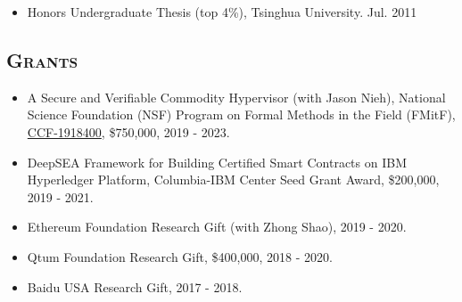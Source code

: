 \documentclass[10pt]{article}
\renewcommand{\section}[1]{
	\vspace{-5pt}
   	\subsection*{\scshape  \bfseries #1}
   }
\newenvironment{innerlist}[1][\enskip\textbullet]%
        {\begin{itemize}[#1,leftmargin=25pt,parsep=0pt,itemsep=2pt,topsep=2pt,partopsep=0pt]}
        {\end{itemize}}
\begin{document}
\begin{innerlist}
\vspace{0.05in}

\item[] Honors Undergraduate Thesis (top 4\%), Tsinghua University. \hfill{Jul. 2011}

%
%
%
%
%
\end{innerlist}

\section{Grants}
\begin{innerlist}

\item[] A Secure and Verifiable Commodity Hypervisor (with Jason Nieh), 
National Science Foundation (NSF) Program on Formal Methods in the                                   
Field (FMitF), \href{https://www.nsf.gov/awardsearch/showAward?AWD_ID=1918400}{CCF-1918400}, \$750,000,  2019 - 2023.

\vspace{0.1in}

\item[] DeepSEA Framework for Building Certified Smart Contracts on IBM Hyperledger Platform, 
Columbia-IBM Center Seed Grant Award, \$200,000,  2019 - 2021.

\vspace{0.1in}



\item[] {Ethereum Foundation Research Gift} (with Zhong Shao), 2019 - 2020.
\vspace{0.1in}

\item[] {Qtum Foundation Research Gift}, \$400,000, 2018 - 2020.
\vspace{0.1in}

\item[] {Baidu USA Research Gift}, 2017 - 2018.
\end{innerlist}
\end{document}
